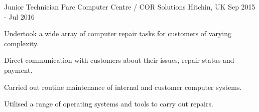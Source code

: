 \begin{cventries}
  \cventry
    {Junior Technician} %
    {Parc Computer Centre / COR Solutions} %
    {Hitchin, UK} %
    {Sep 2015 - Jul 2016} %
    {
      \begin{cvitems} %
        \item {Undertook a wide array of computer repair tasks for customers of varying complexity.}
        \item {Direct communication with customers about their issues, repair status and payment.}
        \item {Carried out routine maintenance of internal and customer computer systems.}
	\item {Utilised a range of operating systems and tools to carry out repairs.}
      \end{cvitems}
    }
\end{cventries}
